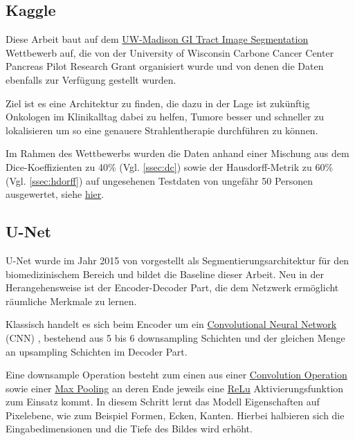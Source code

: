 \subsection{Kaggle} \label{ssec:kaggle}

Diese Arbeit baut auf dem
\href{https://www.kaggle.com/competitions/uw-madison-gi-tract-image-segmentation/overview/description}{UW-Madison GI Tract Image Segmentation}
Wettbewerb auf, die von der University of Wisconsin Carbone Cancer Center Pancreas Pilot Research Grant organisiert wurde und von denen die Daten ebenfalls zur Verfügung gestellt wurden.

Ziel ist es eine Architektur zu finden, die dazu in der Lage ist zukünftig Onkologen im Klinikalltag dabei zu helfen, Tumore besser und schneller zu lokalisieren um so eine genauere Strahlentherapie durchführen zu können. 

Im Rahmen des Wettbewerbs wurden die Daten anhand einer Mischung aus dem Dice-Koeffizienten zu 40\% (Vgl. \ref{ssec:dc}) sowie der Hausdorff-Metrik zu 60\% (Vgl. \ref{ssec:hdorff}) auf ungesehenen Testdaten von ungefähr 50 Personen ausgewertet, siehe  \href{https://www.kaggle.com/competitions/uw-madison-gi-tract-image-segmentation/data}{hier}.

\subsection{U-Net}

U-Net wurde im Jahr 2015 von \citet{U-Net} vorgestellt als Segmentierungsarchitektur für den biomedizinischem Bereich und bildet die Baseline dieser Arbeit. Neu in der Herangehensweise ist der Encoder-Decoder Part, die dem Netzwerk ermöglicht räumliche Merkmale zu lernen.

Klassisch handelt es sich beim Encoder um ein
\href{https://en.wikipedia.org/wiki/Convolutional_neural_network}{Convolutional Neural Network} (CNN) , bestehend aus 5 bis 6 downsampling Schichten und der gleichen Menge an  upsampling Schichten im Decoder Part. 

Eine downsample Operation besteht zum einen aus einer
\href{https://en.wikipedia.org/wiki/Convolution}{Convolution Operation}
sowie einer
\href{https://computersciencewiki.org/index.php/Max-pooling_/_Pooling}{Max Pooling}
an deren Ende jeweils eine
\href{https://deepai.org/machine-learning-glossary-and-terms/relu}{ReLu}
 Aktivierungsfunktion zum Einsatz kommt. In diesem Schritt lernt das Modell Eigenschaften auf Pixelebene, wie zum Beispiel Formen, Ecken, Kanten. Hierbei halbieren sich die Eingabedimensionen und die Tiefe des Bildes wird erhöht. 

